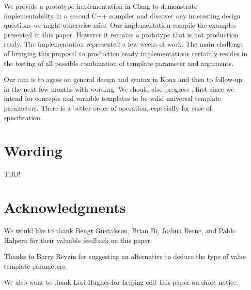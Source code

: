 \documentclass{wg21}
\begin{document}
We provide a prototype implementation in Clang to demonstrate implementability in a second C++ compiler and discover any interesting design questions we might otherwise
miss. Our implementation compile the examples presented in this paper. However it remains a prototype that is not production ready.
The implementation represented a few weeks of work. The main challenge of bringing this proposal to production ready implementations certainly resides in the
testing of all possible combination of template parameter and arguments.


Our aim is to agree on general design and syntax in Kona and then to follow-up in the next few months with wording.
We should also progress , first since we intend for concepts and variable templates to be valid universal template parameters.
There is a better order of operation, especially for ease of specification.

\section{Wording}

TBD!

\section{Acknowledgments}

We would like to thank Bengt Gustafsson, Brian Bi, Joshua Berne, and Pablo Halpern for their
valuable feedback on this paper.

Thanks to Barry Revzin for suggesting an alternative to deduce the type of value template parameters.

We also want to thank Lori Hughes for helping edit this paper on short notice.





\renewcommand{\section}[2]{}%

\begin{thebibliography}{9}


\end{thebibliography}
\end{document}
